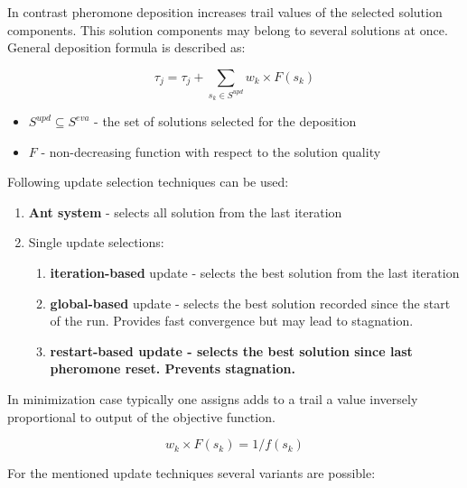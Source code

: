 In contrast pheromone deposition increases trail values of the selected solution components. This solution components may belong to several solutions at once. General deposition formula is described as:

\begin{equation}
\tau_j = \tau_j + \sum \limits_{s_k \in S^{upd}} w_k \times F(s_k)
\end{equation} 

\begin{itemize}
\item $S^{upd} \subseteq S^{eva}$ - the set of solutions selected for the deposition
\item $F$ - non-decreasing function with respect to the solution quality
\end{itemize}

Following update selection techniques can be used:
\begin{enumerate}
\item {\textbf{Ant system} - selects all solution from the last iteration}
\item {Single update selections:}
\begin{enumerate}
\item {\textbf{iteration-based} update - selects the best solution from the last iteration}
\item {\textbf{global-based} update - selects the best solution recorded since the start of the run. Provides fast convergence but may lead to stagnation.}
\item \textbf{{restart-based} update - selects the best solution since last pheromone reset. Prevents stagnation.}
\end{enumerate}
\end{enumerate}

In minimization case typically one assigns adds to a trail a value inversely proportional to output of the objective function.

\begin{equation}
w_k \times F(s_k) = 1 / f(s_k)
\end{equation}

For the mentioned update techniques several variants are possible: \\

